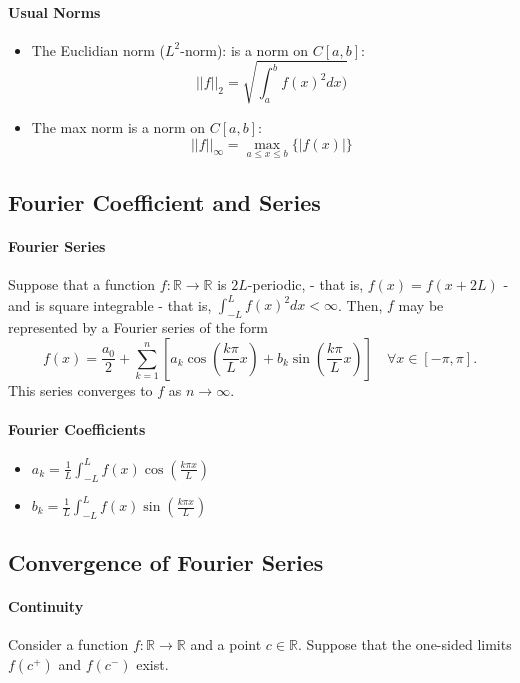 \documentclass[12pt, letterpaper]{article}
\begin{document}
    \paragraph{Usual Norms}
    \begin{itemize}
        \item The Euclidian norm (\(L^2\)-norm): is a norm on \(C[a, b]\):
        \[||f||_2 = \sqrt{\int_a^b f(x)^2 dx)}\]
        \item The max norm is a norm on \(C[a, b]\):
        \[||f||_\infty = \max_{a \leq x \leq b} \{|f(x)|\}\]
    \end{itemize}
    
    \subsection{Fourier Coefficient and Series}

    \paragraph{Fourier Series}
    Suppose that a function \(f: \mathbb{R}\to \mathbb{R}\) is \(2L\)-periodic,
    - that is, \(f(x) = f(x+2L)\) - 
    and is square integrable - that is, \(\int_{-L}^{L}f(x)^2 dx < \infty\).
    Then, \(f\) may be represented by a Fourier series of the form
    \[
        f(x) =
        \frac{a_0}{2} + \sum_{k=1}^n
        \left[
            a_k \cos\left(\frac{k\pi}{L}x\right) + b_k \sin \left(\frac{k\pi}{L}x \right)
        \right]
        \quad
        \forall x\in [-\pi, \pi].
    \]
    This series converges to \(f\) as \(n\to \infty\).
    
    \paragraph{Fourier Coefficients}
    \begin{itemize}
        \item \(a_k = \frac{1}{L} \int_{-L}^{L} f(x) \cos\left( \frac{k\pi x}{L} \right)\)
        \item \(b_k = \frac{1}{L} \int_{-L}^{L} f(x) \sin\left( \frac{k\pi x}{L} \right)\)
    \end{itemize}
    
    \subsection{Convergence of Fourier Series}
    \paragraph{Continuity}
    Consider a function \(f: \mathbb{R}\to \mathbb{R}\) and a point \(c\in \mathbb{R}\).
    Suppose that the one-sided limits \(f(c^+)\) and \(f(c^-)\) exist.
\end{document}
